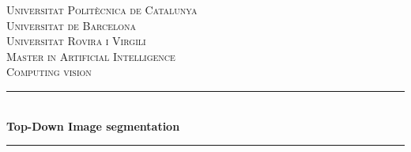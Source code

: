 \begin{titlepage}

\vspace*{\fill}

\newcommand{\HRule}{\rule{\linewidth}{0.5mm}} %

\center %
 

\textsc{\LARGE Universitat Politècnica de Catalunya}\\[0.5cm] %
\textsc{\LARGE Universitat de Barcelona}\\[0.5cm] %
\textsc{\LARGE Universitat Rovira i Virgili}\\[1.5cm] %
\textsc{\Large Master in Artificial Intelligence}\\[0.5cm] %
\textsc{\large Computing vision}\\[0.5cm] %


\HRule \\[0.4cm]
{ \huge \bfseries Top-Down Image segmentation}\\[0.4cm] %
\HRule \\[1.5cm]
 



\end{titlepage}
